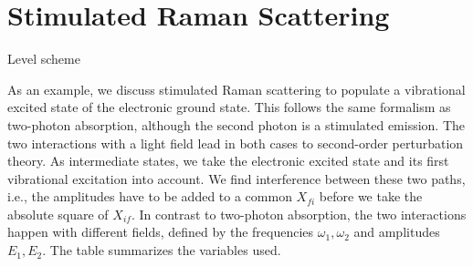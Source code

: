 %
%
%





\section{Stimulated Raman Scattering}


\begin{marginfigure}

\caption{ Level scheme }
\end{marginfigure}


As an example, we discuss stimulated Raman scattering to populate a vibrational excited state of the electronic ground state. This follows the same formalism as two-photon absorption, although the second photon is a stimulated emission. The two interactions with a light field lead in both cases to second-order perturbation theory. As intermediate states, we take the electronic excited state and its first vibrational excitation into account. We find interference between these two paths, i.e., the amplitudes have to be added to a common $X_{fi}$ before we take the absolute square of $X_{if}$. In contrast to two-photon absorption, the two interactions happen with   different fields, defined by the frequencies $\omega_1,\omega_2$ and amplitudes $E_1, E_2$. The table summarizes the variables used.

